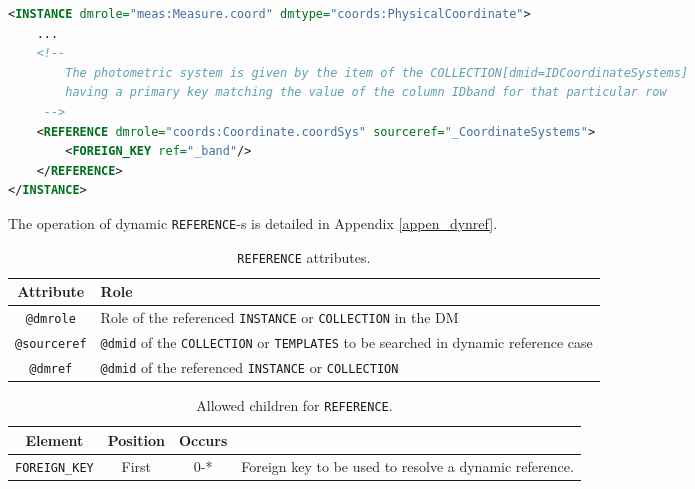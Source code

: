 \begin{lstlisting}[caption={Dynamic \texttt{REFERENCE}, 
                            to be replaced with the \texttt{INSTANCE} of the collection \texttt{\_CoordinateSystems} 
                            having a \texttt{PRIMARY\_KEY} matching the value of the column  \texttt{\_band}.
                            This pattern is valid in the context of a TEMPLATES
                            (see line~\ref{REFERENCE_snippet_2} in Appendix~\ref{appendix_A}).},language=XML]
<INSTANCE dmrole="meas:Measure.coord" dmtype="coords:PhysicalCoordinate">
    ...
    <!--
        The photometric system is given by the item of the COLLECTION[dmid=IDCoordinateSystems]
        having a primary key matching the value of the column IDband for that particular row
     -->
    <REFERENCE dmrole="coords:Coordinate.coordSys" sourceref="_CoordinateSystems">
        <FOREIGN_KEY ref="_band"/>
    </REFERENCE>
</INSTANCE>
\end{lstlisting}

The operation of dynamic \texttt{REFERENCE}-s is detailed in Appendix \ref{appen_dynref}. 

\begin{table}[!htbp]
\small
\centering
\begin{tabulary}{\linewidth}{|c|J|}       
       \hline 
            \textbf{Attribute} & 
            \textbf {Role}\\
       \hline         \hline  
            \texttt{@dmrole} & 
            Role of the referenced \texttt{INSTANCE} or \texttt{COLLECTION} in the DM \\
        \hline 
            \texttt{@sourceref}  &
            \texttt{@dmid} of the \texttt{COLLECTION} or \texttt{TEMPLATES} to be searched in dynamic reference case \\
        \hline 
            \texttt{@dmref} & 
            \texttt{@dmid} of the referenced \texttt{INSTANCE} or \texttt{COLLECTION}\\
        \hline 
     \end{tabulary}
     \caption{\texttt{REFERENCE} attributes.} 
     \label{tbl:reference-att}
 \end{table}

\begin{table}[!htbp]
\small
\centering
\begin{tabulary}{\linewidth}{|c |c |c|J|}
    \hline 
        \textbf{Element} &
        \textbf{Position} &
        \textbf{Occurs} &
        \\
    \hline      \hline  
        \texttt{FOREIGN\_KEY}  &        
        First &           
        0-* &
        Foreign key to be used to resolve a dynamic reference.\\
    \hline 
\end{tabulary}
     \caption{Allowed children for \texttt{REFERENCE}.} 
     \label{tbl:reference-children}
\end{table}


